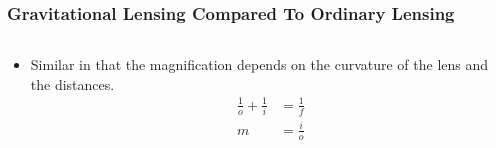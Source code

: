 \documentclass{beamer}
\begin{document}
\frame
{

    \frametitle{Gravitational Lensing Compared To Ordinary Lensing}


    \begin{columns}
        \begin{column}{0.5\textwidth}
            \begin{itemize}

                \item Similar in that the magnification depends on the
                    curvature of the lens and the distances.
                    \begin{align}
                        \frac{1}{o} + \frac{1}{i} &= \frac{1}{f} \nonumber \\
                        m &= \frac{i}{o} \nonumber
                    \end{align}


\end{itemize}
\end{column}
\end{columns}}
\end{document}
